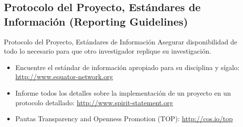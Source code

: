 \documentclass{beamer}
\begin{document}
{%
     \begin{frame}[plain]
     \end{frame}
}


\subsection*{Protocolo del Proyecto, Estándares de Información (Reporting Guidelines)}
\begin{frame}[<.->]{Protocolo del Proyecto, Estándares de Información}
Asegurar disponibilidad de todo lo necesario para que otro investigador replique su investigación.
 \begin{itemize}
 \item Encuentre el estándar de información apropiado para su disciplina y sígalo: \url{http://www.equator-network.org}
\item Informe todos los detalles sobre la implementación de un proyecto en un protocolo detallado: \url{http://www.spirit-statement.org}
\item Pautas Transparency and Openness Promotion (TOP): \url{http://cos.io/top}
\end{itemize}
\end{frame}
\end{document}
